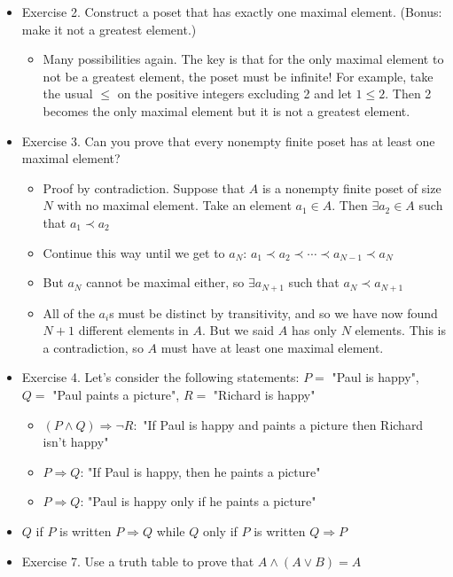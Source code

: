 \documentclass{article}
\begin{document}
\begin{itemize}
\begin{itemize}
    \end{itemize}
    \item Exercise 2. Construct a poset that has exactly one maximal element. (Bonus: make it not a greatest element.)
    \begin{itemize}
        \item Many possibilities again. The key is that for the only maximal element to not be a greatest element, the poset must be infinite! For example, take the usual $\le$ on the positive integers excluding 2 and let $1 \le 2$. Then 2 becomes the only maximal element but it is not a greatest element.
    \end{itemize}
    \item Exercise 3. Can you prove that every nonempty finite poset has at least one maximal element?
    \begin{itemize}
        \item Proof by contradiction. Suppose that $A$ is a nonempty finite poset of size $N$ with no maximal element. Take an element $a_1 \in A$. Then $\exists a_2 \in A$ such that $a_1 \prec a_2$
        \item Continue this way until we get to $a_N$: $a_1 \prec a_2 \prec \cdots \prec a_{N-1} \prec a_N$
        \item But $a_N$ cannot be maximal either, so $\exists a_{N+1}$ such that $a_N \prec a_{N+1}$
        \item All of the $a_i$s must be distinct by transitivity, and so we have now found $N+1$ different elements in $A$. But we said $A$ has only $N$ elements. This is a contradiction, so $A$ must have at least one maximal element.
    \end{itemize}
    \item Exercise 4. Let's consider the following statements: $P = $ "Paul is happy", $Q =$ "Paul paints a picture", $R =$ "Richard is happy"
    \begin{itemize}
        \item $(P \wedge Q) \Rightarrow \neg R:$ "If Paul is happy and paints a picture then Richard isn't happy"
        \item $P \Rightarrow Q$: "If Paul is happy, then he paints a picture"
        \item $P \Rightarrow Q$: "Paul is happy only if he paints a picture"
    \end{itemize}
    \item $Q$ if $P$ is written $P \Rightarrow Q$ while $Q$ only if $P$ is written $Q \Rightarrow P$
    \item Exercise 7. Use a truth table to prove that $A \wedge (A \vee B) = A$

\end{itemize}
\end{document}
